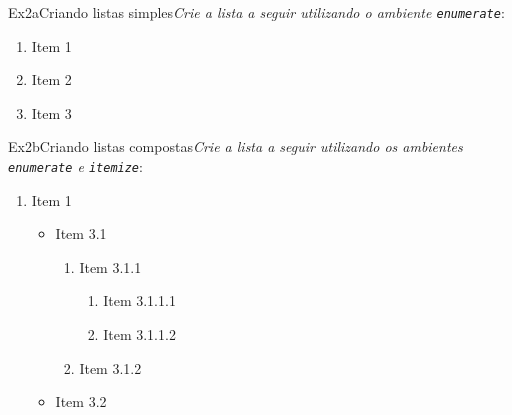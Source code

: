 \begin{texercise}{Ex2a}{Criando listas simples}\textit{Crie a lista a seguir utilizando o ambiente \texttt{enumerate}}:\par\smallskip%
\begin{tcboutputlisting}
\begin{enumerate}
    \item Item 1
    \item Item 2
    \item Item 3
\end{enumerate}
\end{tcboutputlisting}
\tcbuselistingtext%
\end{texercise}

\begin{texercise}{Ex2b}{Criando listas compostas}\textit{Crie a lista a seguir utilizando os ambientes \texttt{enumerate} e \texttt{itemize}}:\par\smallskip%
\begin{tcboutputlisting}
\begin{enumerate}
    \item Item 1
    \begin{itemize}
        \item Item 3.1
         \begin{enumerate}
            \item Item 3.1.1
            \begin{enumerate}
                \item Item 3.1.1.1
                \item Item 3.1.1.2
            \end{enumerate}
            \item Item 3.1.2
        \end{enumerate}
        \item Item 3.2
    \end{itemize}
\end{enumerate}
\end{tcboutputlisting}
\tcbuselistingtext%
\end{texercise}

